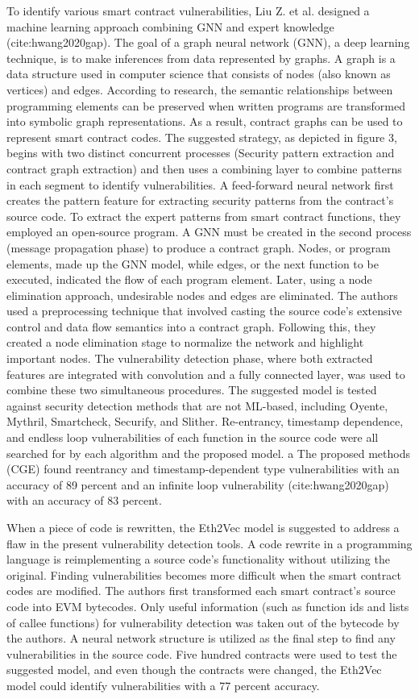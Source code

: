 To identify various smart contract vulnerabilities, Liu Z. et al. designed a machine learning approach combining GNN and expert knowledge (cite:hwang2020gap).
The goal of a graph neural network (GNN), a deep learning technique, is to make inferences from data represented by graphs.
A graph is a data structure used in computer science that consists of nodes (also known as vertices) and edges. According to research, the semantic relationships between programming elements can be preserved when written programs are transformed into symbolic graph representations.
As a result, contract graphs can be used to represent smart contract codes.
The suggested strategy, as depicted in figure 3, begins with two distinct concurrent processes (Security pattern extraction and contract graph extraction) and then uses a combining layer to combine patterns in each segment to identify vulnerabilities.
A feed-forward neural network first creates the pattern feature for extracting security patterns from the contract's source code.
To extract the expert patterns from smart contract functions, they employed an open-source program.
A GNN must be created in the second process (message propagation phase) to produce a contract graph.
Nodes, or program elements, made up the GNN model, while edges, or the next function to be executed, indicated the flow of each program element.
Later, using a node elimination approach, undesirable nodes and edges are eliminated.
The authors used a preprocessing technique that involved casting the source code's extensive control and data flow semantics into a contract graph.
Following this, they created a node elimination stage to normalize the network and highlight important nodes.
The vulnerability detection phase, where both extracted features are integrated with convolution and a fully connected layer, was used to combine these two simultaneous procedures.
The suggested model is tested against security detection methods that are not ML-based, including Oyente, Mythril, Smartcheck, Securify, and Slither.
Re-entrancy, timestamp dependence, and endless loop vulnerabilities of each function in the source code were all searched for by each algorithm and the proposed model.
a
The proposed methods (CGE) found reentrancy and timestamp-dependent type vulnerabilities with an accuracy of 89 percent and an infinite loop vulnerability (cite:hwang2020gap) with an accuracy of 83 percent.


When a piece of code is rewritten, the Eth2Vec model is suggested to address a flaw in the present vulnerability detection tools. A code rewrite in a programming language is reimplementing a source code's functionality without utilizing the original.
Finding vulnerabilities becomes more difficult when the smart contract codes are modified.
The authors first transformed each smart contract's source code into EVM bytecodes.
Only useful information (such as function ids and lists of callee functions) for vulnerability detection was taken out of the bytecode by the authors.
A neural network structure is utilized as the final step to find any vulnerabilities in the source code.
Five hundred contracts were used to test the suggested model, and even though the contracts were changed, the Eth2Vec model could identify vulnerabilities with a 77 percent accuracy.

